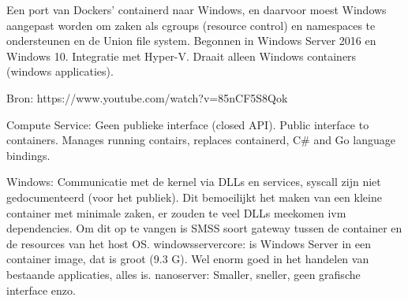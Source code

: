 Een port van Dockers' containerd naar Windows, en daarvoor moest Windows aangepast worden om zaken als cgroups (resource control) en namespaces te ondersteunen en de Union file system. Begonnen in Windows Server 2016 en Windows 10. Integratie met Hyper-V. Draait alleen Windows containers (windows applicaties).

Bron: https://www.youtube.com/watch?v=85nCF5S8Qok

Compute Service: Geen publieke interface (closed API).
Public interface to containers.
Manages running contairs, replaces containerd, C\# and Go language bindings.

Windows: Communicatie met de kernel via DLLs en services, syscall zijn niet gedocumenteerd (voor het publiek). Dit bemoeilijkt het maken van een kleine container met minimale zaken, er zouden te veel DLLs meekomen ivm dependencies. Om dit op te vangen is SMSS soort gateway tussen de container en de resources van het host OS.
windowsservercore: is Windows Server in een container image, dat is groot (9.3 G). Wel enorm goed in het handelen van bestaande applicaties, alles is.
nanoserver: Smaller, sneller, geen grafische interface enzo.
